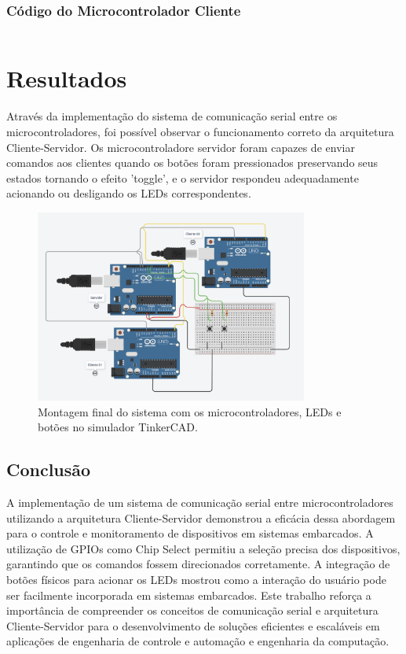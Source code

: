 \documentclass[12pt, a4paper]{article}
\begin{document}
\subsubsection{Código do Microcontrolador Cliente}
\begin{mybox}[label={lst:codigo_cliente},title={Código do Microcontrolador Cliente}]{}
	\inputminted[fontsize=\footnotesize,breaklines,linenos]{cpp}{codigo_cliente.ino}
\end{mybox}
\newpage
\section{Resultados}
Através da implementação do sistema de comunicação serial entre os microcontroladores, foi possível observar o funcionamento correto da arquitetura Cliente-Servidor. Os microcontroladore servidor foram capazes de enviar comandos aos clientes quando os botões foram pressionados preservando seus estados tornando o efeito 'toggle', e o servidor respondeu adequadamente acionando ou desligando os LEDs correspondentes.
\begin{figure}[H]
	\centering
	\includegraphics[width=0.8\textwidth]{arduino.png}
	\caption{Montagem final do sistema com os microcontroladores, LEDs e botões no simulador TinkerCAD.}
	\label{fig:resultado}
\end{figure}

\newpage
\begin{center}
	\section{Conclusão}
\end{center}

A implementação de um sistema de comunicação serial entre microcontroladores utilizando a arquitetura Cliente-Servidor demonstrou a eficácia dessa abordagem para o controle e monitoramento de dispositivos em sistemas embarcados. A utilização de GPIOs como Chip Select permitiu a seleção precisa dos dispositivos, garantindo que os comandos fossem direcionados corretamente. A integração de botões físicos para acionar os LEDs mostrou como a interação do usuário pode ser facilmente incorporada em sistemas embarcados. Este trabalho reforça a importância de compreender os conceitos de comunicação serial e arquitetura Cliente-Servidor para o desenvolvimento de soluções eficientes e escaláveis em aplicações de engenharia de controle e automação e engenharia da computação.
\end{document}
